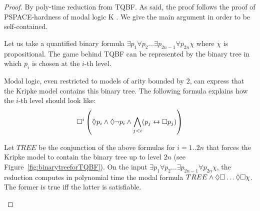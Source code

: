 \begin{proof}
	By poly-time reduction from TQBF. As said, the proof follows the proof of PSPACE-hardness of modal logic K \cite{DBLP:books/cu/BlackburnRV01}. We give the main argument in order to be self-contained.
	
	Let us take a quantified binary formula $\exists p_1 \forall p_2 \dots \exists p_{2n-1} \forall p_{2n} \chi$ where $\chi$ is propositional.
	The game behind TQBF can be represented by the binary tree in which $p_i$ is chosen at the $i$-th level.
	
	
	
	Modal logic, even restricted to models of arity bounded by $2$, can express that the Kripke model contains this binary tree. The following formula explains how the $i$-th level should look like:
%
 $$\square ^i \left( \Diamond p_i \land \Diamond \lnot p_i \land \bigwedge_{j<i} (p_j \leftrightarrow \square p_j) \right)$$
	
	
	Let $TREE$ be the conjunction of the above formulas for $i=1..2n$ that forces the Kripke model to contain the binary tree up to level $2n$ (see Figure~\ref{fig:binarytreeforTQBF}). On the input $\exists p_1 \forall p_2 \dots \exists p_{2n-1} \forall p_{2n} \chi$, the reduction computes in polynomial time the modal formula $TREE \land \Diamond \square \dots \Diamond \square \chi$. The former is true iff the latter is satisfiable.
	
	
	\begin{figure*}[ht]
		\begin{center}
		\end{center}
		

\end{figure*}
\end{proof}
